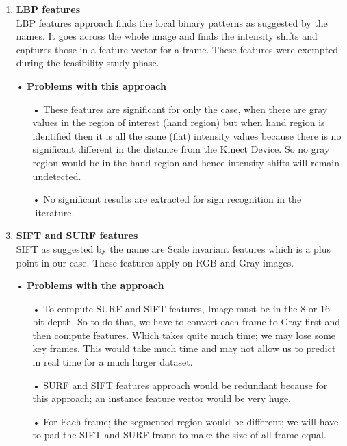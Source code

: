 \begin{enumerate}
\item \textbf{LBP features  \\}
LBP features approach finds the local binary patterns as suggested by the names. It goes across the whole image and finds the intensity shifts and captures those in a feature vector for a frame. These features were exempted during the feasibility study phase.
\item[•] \textbf{Problems with this approach}
\begin{enumerate}
\item[•]These features are significant for only the case, when there are gray values in the region of interest (hand region) but when hand region is identified then it is all the same (flat) intensity values because there is no significant different in the distance from the Kinect Device. So no gray region would be in the hand region and hence intensity shifts will remain undetected.
\item[•]No significant results are extracted for sign recognition in the literature.
\end{enumerate}

\item \textbf{SIFT and SURF features  \\}
SIFT as suggested by the name are Scale invariant features which is a plus point in our case. These features apply on RGB and Gray images.
\item[•] \textbf{Problems with the approach}
\begin{enumerate}
\item[•]To compute SURF and SIFT features, Image must be in the 8 or 16 bit-depth. So to do that, we have to convert each frame to Gray first and then compute features. Which takes quite much time; we may lose some key frames. This would take much time and may not allow us to predict in real time for a much larger dataset.
\item[•]SURF and SIFT features approach would be redundant because for this approach; an instance feature vector would be very huge.
\item[•]For Each frame; the segmented region would be different; we will have to pad the SIFT and SURF frame to make the size of all frame equal.
\end{enumerate}

\end{enumerate}
\clearpage
